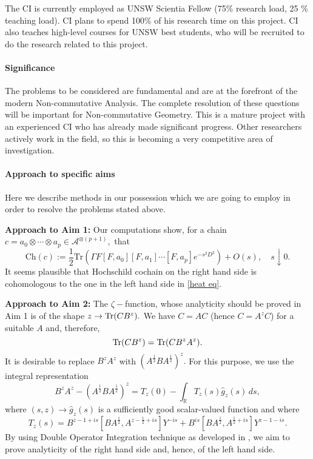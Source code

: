 \documentclass{article}
\newcommand{\archeading}[1]{\vspace{.3cm} \noindent{\bfseries #1} \vspace{.1cm}   }
\begin{document}
The CI is currently employed as UNSW Scientia Fellow (75\% research load, 25 \% teaching load). CI plans to spend 100\% of his research time on this project. CI also teaches high-level courses for UNSW best students, who will be recruited to do the research related to this project.

\bigskip\archeading{Project quality and innovation}

\paragraph*{Significance} The problems to be considered are fundamental and are at the forefront of the modern Non-commutative Analysis. The complete resolution of these questions will be important for Non-commutative Geometry. This is a mature project with an experienced CI who has already made significant progress. Other researchers actively work in the field, so this is becoming a very competitive area of investigation.

\paragraph*{Approach to specific aims} Here we describe methods in our possession which we are going to employ in order to resolve the problems stated above.

{\bf Approach to Aim 1:} Our computations show, for a chain $c=a_0\otimes\cdots\otimes a_p\in\mathcal{A}^{\otimes (p+1)},$ that
$$\mathrm{Ch}(c) := \frac{1}{2}\mathrm{Tr}(\Gamma F[F,a_0][F,a_1]\cdots[F,a_p]e^{-s^2D^2})+O(s),\quad s\downarrow 0.$$
It seems plausible that Hochschild cochain on the right hand side is cohomologous to the one in the left hand side in \eqref{heat eq}.

{\bf Approach to Aim 2:} The $\zeta-$function, whose analyticity should be proved in Aim 1 is of the shape $z\to {\rm Tr}(CB^z).$ We have $C=AC$ (hence $C=A^zC$) for a suitable $A$ and, therefore,
$${\rm Tr}(CB^z)={\rm Tr}(CB^zA^z).$$
It is desirable to replace $B^zA^z$ with $(A^{\frac12}BA^{\frac12})^z.$ For this purpose, we use the integral representation
$$B^zA^z-(A^{\frac{1}{2}}BA^{\frac{1}{2}})^z = T_z(0)-\int_{\mathbb{R}} T_z(s)\widehat{g}_z(s)\,ds,$$ 
where $(s,z)\to\widehat{g}_z(s)$ is a sufficiently good scalar-valued function and where
$$T_z(s)= B^{z-1+is}[BA^{\frac{1}{2}},A^{z-\frac{1}{2}+is}]Y^{-is}+B^{is}[BA^{\frac{1}{2}},A^{\frac{1}{2}+is}]Y^{z-1-is}.$$
By using Double Operator Integration technique as developed in \cite{PotapovSukochev}, we aim to prove analyticity of the right hand side and, hence, of the left hand side.
\end{document}
